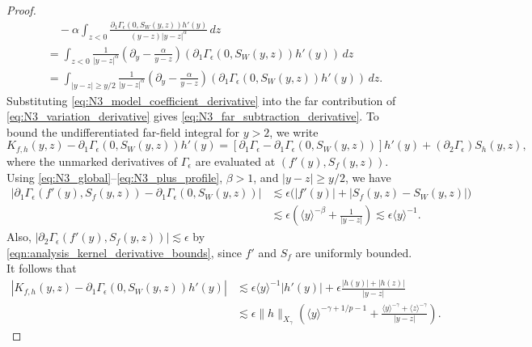 \documentclass[11pt]{amsart}
\theoremstyle{definition}
\theoremstyle{remark}
\numberwithin{equation}{section}
\newcommand{\ang}[1]{\langle #1 \rangle}
\begin{document}
\begin{proof}
\begin{equation}
\begin{aligned}
    &\quad-\alpha\int_{z<0}
    \frac{\partial_1\Gamma_\epsilon(0,S_W(y,z))h'(y)}{(y-z)|y-z|^\alpha}\,dz\\
    &=\int_{z<0}\frac{1}{|y-z|^\alpha}
    \left(\partial_y-\frac{\alpha}{y-z}\right)
    \left(\partial_1\Gamma_\epsilon(0,S_W(y,z))h'(y)\right)\,dz\\
    &=\int_{|y-z|\geq y/2}\frac{1}{|y-z|^\alpha}
    \left(\partial_y-\frac{\alpha}{y-z}\right)
    \left(\partial_1\Gamma_\epsilon(0,S_W(y,z))h'(y)\right)\,dz.
\end{aligned}
\end{equation}
Substituting \eqref{eq:N3_model_coefficient_derivative} into the far contribution of \eqref{eq:N3_variation_derivative} gives \eqref{eq:N3_far_subtraction_derivative}.
To bound the undifferentiated far-field integral for $y > 2$, we write
\begin{equation}\label{eq:N3_far_decomposition}
    K_{f,h}(y,z)-\partial_1\Gamma_\epsilon(0,S_W(y,z))h'(y)
    =[\partial_1\Gamma_\epsilon-\partial_1\Gamma_\epsilon(0,S_W(y,z))]h'(y)
    +(\partial_2\Gamma_\epsilon)S_h(y,z),
\end{equation}
where the unmarked derivatives of $\Gamma_\epsilon$ are evaluated at $(f'(y),S_f(y,z))$.
Using \eqref{eq:N3_global}--\eqref{eq:N3_plus_profile}, $\beta>1$, and $|y-z|\geq y/2$, we have
\begin{equation}\label{eq:N3_far_coefficient_bound}
\begin{aligned}
    |\partial_1\Gamma_\epsilon(f'(y),S_f(y,z))-\partial_1\Gamma_\epsilon(0,S_W(y,z))|
    &\lesssim\epsilon\bigl(|f'(y)|+|S_f(y,z)-S_W(y,z)|\bigr)\\
    &\lesssim\epsilon\left(\ang{y}^{-\beta}+\frac{1}{|y-z|}\right)
    \lesssim\epsilon\ang{y}^{-1}.
\end{aligned}
\end{equation}
Also, $|\partial_2\Gamma_\epsilon(f'(y),S_f(y,z))|\lesssim\epsilon$ by
\eqref{eqn:analysis_kernel_derivative_bounds}, since $f'$ and $S_f$ are uniformly bounded.
It follows that
\begin{equation}\label{eq:N3_far_integrand_bound}
\begin{aligned}
    |K_{f,h}(y,z)-\partial_1\Gamma_\epsilon(0,S_W(y,z))h'(y)|
    &\lesssim\epsilon\ang{y}^{-1}|h'(y)|
    +\epsilon\frac{|h(y)|+|h(z)|}{|y-z|}\\
    &\lesssim\epsilon\|h\|_{X_\gamma}
    \left(\ang{y}^{-\gamma+1/p-1}
    +\frac{\ang{y}^{-\gamma}+\ang{z}^{-\gamma}}{|y-z|}\right).
\end{aligned}

\end{equation}
\end{proof}
\end{document}
